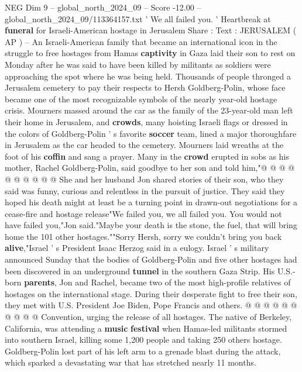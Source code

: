 \begin{textsample}{NEG Dim 9 – global\_north\_2024\_09 – Score -12.00 – global\_north\_2024\_09/113364157.txt}  \label{ex:f9_neg_006}
' We all failed you. ' Heartbreak at \textbf{funeral} for Israeli-American hostage in Jerusalem Share : Text : JERUSALEM ( AP ) -- An Israeli-American family that became an international icon in the struggle to free hostages from Hamas \textbf{captivity} in Gaza laid their son to rest on Monday after he was said to have been killed by militants as soldiers were approaching the spot where he was being held.
Thousands of people thronged a Jerusalem cemetery to pay their respects to Hersh Goldberg-Polin, whose face became one of the most recognizable symbols of the nearly year-old hostage crisis.
Mourners massed around the car as the family of the 23-year-old man left their home in Jerusalem, and \textbf{crowds}, many hoisting Israeli flags or dressed in the colors of Goldberg-Polin ' s favorite \textbf{soccer} team, lined a major thoroughfare in Jerusalem as the car headed to the cemetery.
Mourners laid wreaths at the foot of his \textbf{coffin} and sang a prayer.
Many in the \textbf{crowd} erupted in sobs as his mother, Rachel Goldberg-Polin, said goodbye to her son and told him,"@ @ @ @ @ @ @ @ @ @ She and her husband Jon shared stories of their son, who they said was funny, curious and relentless in the pursuit of justice.
They said they hoped his death might at least be a turning point in drawn-out negotiations for a cease-fire and hostage release"We failed you, we all failed you.
You would not have failed you,"Jon said."Maybe your death is the stone, the fuel, that will bring home the 101 other hostages.""Sorry Hersh, sorry we couldn't bring you back \textbf{alive},"Israel ' s President Isaac Herzog said in a eulogy.
Israel ' s military announced Sunday that the bodies of Goldberg-Polin and five other hostages had been discovered in an underground \textbf{tunnel} in the southern Gaza Strip.
His U.S.-born \textbf{parents}, Jon and Rachel, became two of the most high-profile relatives of hostages on the international stage.
During their desperate fight to free their son, they met with U.S.
President Joe Biden, Pope Francis and others. @ @ @ @ @ @ @ @ @ @ Convention, urging the release of all hostages.
The native of Berkeley, California, was attending a \textbf{music} \textbf{festival} when Hamas-led militants stormed into southern Israel, killing some 1,200 people and taking 250 others hostage.
Goldberg-Polin lost part of his left arm to a grenade blast during the attack, which sparked a devastating war that has stretched nearly 11 months.

\end{textsample}
